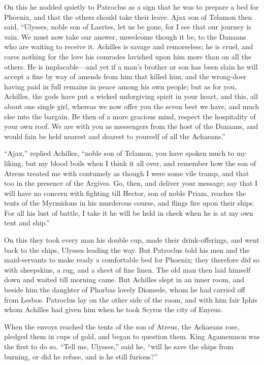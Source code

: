 On this he nodded quietly to Patroclus as a sign that he was to prepare a
bed for Phoenix, and that the others should take their leave. Ajax son of
Telamon then said, “Ulysses, noble son of Laertes, let us be gone, for I
see that our journey is vain. We must now take our answer, unwelcome
though it be, to the Danaans who are waiting to receive it. Achilles is
savage and remorseless; he is cruel, and cares nothing for the love his
comrades lavished upon him more than on all the others. He is implacable—and
yet if a man’s brother or son has been slain he will accept a fine by way
of amends from him that killed him, and the wrong-doer having paid in full
remains in peace among his own people; but as for you, Achilles, the gods
have put a wicked unforgiving spirit in your heart, and this, all about
one single girl, whereas we now offer you the seven best we have, and much
else into the bargain. Be then of a more gracious mind, respect the
hospitality of your own roof. We are with you as messengers from the host
of the Danaans, and would fain be held nearest and dearest to yourself of
all the Achaeans.”

“Ajax,” replied Achilles, “noble son of Telamon, you have spoken much to
my liking, but my blood boils when I think it all over, and remember how
the son of Atreus treated me with contumely as though I were some vile
tramp, and that too in the presence of the Argives. Go, then, and deliver
your message; say that I will have no concern with fighting till Hector,
son of noble Priam, reaches the tents of the Myrmidons in his murderous
course, and flings fire upon their ships. For all his lust of battle, I
take it he will be held in check when he is at my own tent and ship.”

On this they took every man his double cup, made their drink-offerings,
and went back to the ships, Ulysses leading the way. But Patroclus told
his men and the maid-servants to make ready a comfortable bed for Phoenix;
they therefore did so with sheepskins, a rug, and a sheet of fine linen.
The old man then laid himself down and waited till morning came. But
Achilles slept in an inner room, and beside him the daughter of Phorbas
lovely Diomede, whom he had carried off from Lesbos. Patroclus lay on the
other side of the room, and with him fair Iphis whom Achilles had given
him when he took Scyros the city of Enyeus.

When the envoys reached the tents of the son of Atreus, the Achaeans rose,
pledged them in cups of gold, and began to question them. King Agamemnon
was the first to do so. “Tell me, Ulysses,” said he, “will he save the
ships from burning, or did he refuse, and is he still furious?”

